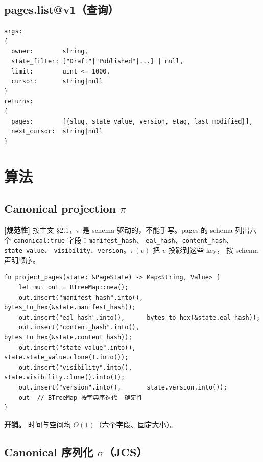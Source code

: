 \documentclass[11pt,a4paper]{article}
\newcommand{\normsv}{\textcolor{normativecolor}{\textbf{[规范性]}}\xspace}
\theoremstyle{definition}
\begin{document}
\subsection{pages.list@v1（查询）}

\begin{lstlisting}
args:
{
  owner:        string,
  state_filter: ["Draft"|"Published"|...] | null,
  limit:        uint <= 1000,
  cursor:       string|null
}
returns:
{
  pages:        [{slug, state_value, version, etag, last_modified}],
  next_cursor:  string|null
}
\end{lstlisting}

\section{算法}
\label{sec:algorithms}

\subsection{Canonical projection $\pi$}

\normsv{} 按主文 \S2.1，$\pi$ 是 schema 驱动的，不能手写。pages 的
schema 列出六个 \texttt{canonical:true} 字段：\texttt{manifest\_hash}、
\texttt{eal\_hash}、\texttt{content\_hash}、\texttt{state\_value}、
\texttt{visibility}、\texttt{version}。$\pi(v)$ 把 $v$ 投影到这些 key，
按 schema 声明顺序。

\begin{lstlisting}
fn project_pages(state: &PageState) -> Map<String, Value> {
    let mut out = BTreeMap::new();
    out.insert("manifest_hash".into(), bytes_to_hex(&state.manifest_hash));
    out.insert("eal_hash".into(),      bytes_to_hex(&state.eal_hash));
    out.insert("content_hash".into(),  bytes_to_hex(&state.content_hash));
    out.insert("state_value".into(),   state.state_value.clone().into());
    out.insert("visibility".into(),    state.visibility.clone().into());
    out.insert("version".into(),       state.version.into());
    out  // BTreeMap 按字典序迭代——确定性
}
\end{lstlisting}

\textbf{开销。} 时间与空间均 $O(1)$（六个字段、固定大小）。

\subsection{Canonical 序列化 $\sigma$（JCS）}
\end{document}
